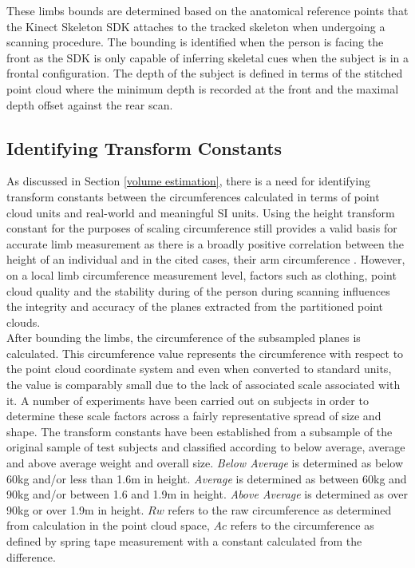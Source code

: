 These limbs bounds are determined based on the anatomical reference points that the Kinect Skeleton SDK attaches to the tracked skeleton when undergoing a scanning procedure. The bounding is identified when the person is facing the front as the SDK is only capable of inferring skeletal cues when the subject is in a frontal configuration. The depth of the subject is defined in terms of the stitched point cloud where the minimum depth is recorded at the front and the maximal depth offset against the rear scan.

\subsection{Identifying Transform Constants}

As discussed in Section \ref{volume estimation}, there is a need for identifying transform constants between the circumferences calculated in terms of point cloud units and real-world and meaningful SI units. Using the height transform constant for the purposes of scaling circumference still provides a valid basis for accurate limb measurement as there is a broadly positive correlation between the height of an individual and in the cited cases, their arm circumference \cite{Todorovic2003}. However, on a local limb circumference measurement level, factors such as clothing, point cloud quality and the stability during of the person during scanning influences the integrity and accuracy of the planes extracted from the partitioned point clouds. \\

After bounding the limbs, the circumference of the subsampled planes is calculated. This circumference value represents the circumference with respect to the point cloud coordinate system and even when converted to standard units, the value is comparably small due to the lack of associated scale associated with it. A number of experiments have been carried out on subjects in order to determine these scale factors across a fairly representative spread of size and shape. The transform constants have been established from a subsample of the original sample of test subjects and classified according to below average, average and above average weight and overall size. \emph{Below Average} is determined as below 60kg and/or less than 1.6m in height. \emph{Average} is determined as between 60kg and 90kg and/or between 1.6 and 1.9m in height. \emph{Above Average} is determined as over 90kg or over 1.9m in height.  $Rw$ refers to the raw circumference as determined from calculation in the point cloud space, $Ac$ refers to the circumference as defined by spring tape measurement with a constant calculated from the difference.

